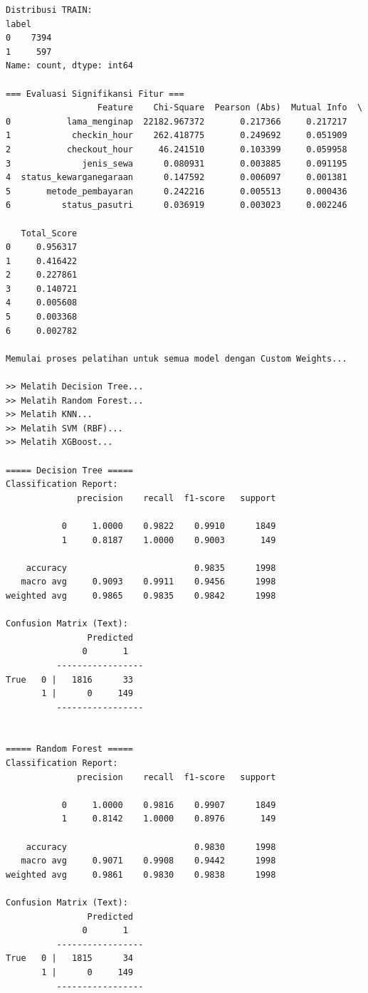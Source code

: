 \begin{lstlisting}[caption={Output 9}]
Distribusi TRAIN:
label
0    7394
1     597
Name: count, dtype: int64

=== Evaluasi Signifikansi Fitur ===
                  Feature    Chi-Square  Pearson (Abs)  Mutual Info  \
0           lama_menginap  22182.967372       0.217366     0.217217   
1            checkin_hour    262.418775       0.249692     0.051909   
2           checkout_hour     46.241510       0.103399     0.059958   
3              jenis_sewa      0.080931       0.003885     0.091195   
4  status_kewarganegaraan      0.147592       0.006097     0.001381   
5       metode_pembayaran      0.242216       0.005513     0.000436   
6          status_pasutri      0.036919       0.003023     0.002246   

   Total_Score  
0     0.956317  
1     0.416422  
2     0.227861  
3     0.140721  
4     0.005608  
5     0.003368  
6     0.002782  

Memulai proses pelatihan untuk semua model dengan Custom Weights...

>> Melatih Decision Tree...
>> Melatih Random Forest...
>> Melatih KNN...
>> Melatih SVM (RBF)...
>> Melatih XGBoost...

===== Decision Tree =====
Classification Report:
              precision    recall  f1-score   support

           0     1.0000    0.9822    0.9910      1849
           1     0.8187    1.0000    0.9003       149

    accuracy                         0.9835      1998
   macro avg     0.9093    0.9911    0.9456      1998
weighted avg     0.9865    0.9835    0.9842      1998

Confusion Matrix (Text):
                Predicted
               0       1
          -----------------
True   0 |   1816      33
       1 |      0     149
          -----------------


===== Random Forest =====
Classification Report:
              precision    recall  f1-score   support

           0     1.0000    0.9816    0.9907      1849
           1     0.8142    1.0000    0.8976       149

    accuracy                         0.9830      1998
   macro avg     0.9071    0.9908    0.9442      1998
weighted avg     0.9861    0.9830    0.9838      1998

Confusion Matrix (Text):
                Predicted
               0       1
          -----------------
True   0 |   1815      34
       1 |      0     149
          -----------------



\end{lstlisting}
